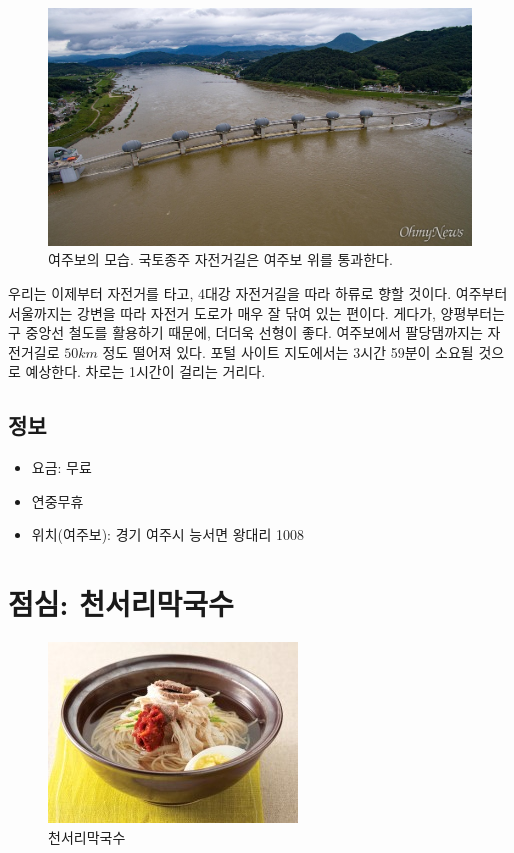 \begin{figure}[ht]
    \centering
    \includegraphics[width=.6\textwidth]{img/여주보.jpg}
    \caption{여주보의 모습. 국토종주 자전거길은 여주보 위를 통과한다. \protect\footnotemark}
    \label{fig:my_labe7}
\end{figure}


우리는 이제부터 자전거를 타고, 4대강 자전거길을 따라 하류로 향할 것이다.
여주부터 서울까지는 강변을 따라 자전거 도로가 매우 잘 닦여 있는 편이다.
게다가, 양평부터는 구 중앙선 철도를 활용하기 때문에, 더더욱 선형이 좋다.
여주보에서 팔당댐까지는 자전거길로 $50km$ 정도 떨어져 있다. 
포털 사이트 지도에서는 3시간 59분이 소요될 것으로 예상한다.
차로는 1시간이 걸리는 거리다.

\subsection{정보}
\begin{itemize}
    \item 요금: 무료
    \item 연중무휴
    \item 위치(여주보): 경기 여주시 능서면 왕대리 1008 
\end{itemize}

\section{점심: 천서리막국수}


\begin{figure}[ht]
    \centering
    \includegraphics[width=.6\textwidth]{img/막국수.jpg}
    \caption{천서리막국수\protect\footnotemark}
    \label{fig:my_labe71}
\end{figure}
\footnotetext{\href{https://terms.naver.com/entry.naver?docId=1627391&cid=48179&categoryId=48238}{[천서리막국수 $|$ 전통향토음식 용어사전}}




